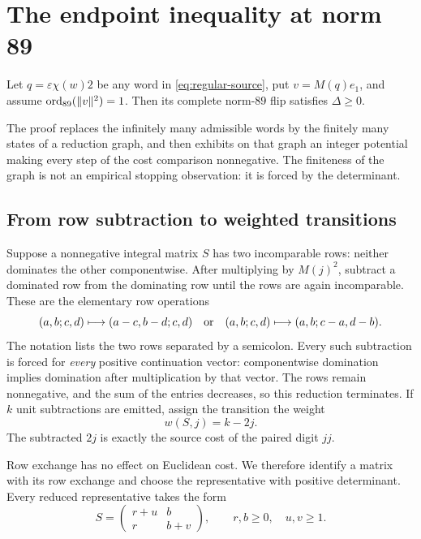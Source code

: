 \section{The endpoint inequality at norm 89}
\label{sec:endpoint}

\begin{theorem}
\label{thm:endpoint-89}
Let $q=\varepsilon\chi(w)2$ be any word in \eqref{eq:regular-source}, put
$v=M(q)e_1$, and assume $\operatorname{ord}_{89}(\|v\|^2)=1$. Then its complete norm-$89$
flip satisfies $\Delta\geqslant0$.
\end{theorem}

The proof replaces the infinitely many admissible words by the finitely
many states of a reduction graph, and then exhibits on that graph an
integer potential making every step of the cost comparison nonnegative.
The finiteness of the graph is not an empirical stopping observation: it
is forced by the determinant.

\subsection{From row subtraction to weighted transitions}

Suppose a nonnegative integral matrix $S$ has two incomparable rows:
neither dominates the other componentwise. After multiplying by $M(j)^2$,
subtract a dominated row from the dominating row until the rows are again
incomparable. These are the elementary row operations
$$
 (a,b;c,d)\longmapsto(a-c,b-d;c,d)
 \quad\hbox{or}\quad
 (a,b;c,d)\longmapsto(a,b;c-a,d-b).
$$
The notation lists the two rows separated by a semicolon. Every such
subtraction is forced for \emph{every} positive continuation vector:
componentwise domination implies domination after multiplication by that
vector. The rows remain nonnegative, and the sum of the entries decreases,
so this reduction terminates. If $k$ unit subtractions are emitted, assign
the transition the weight
\begin{equation}
 w(S,j)=k-2j.
 \label{eq:edge-weight}
\end{equation}
The subtracted $2j$ is exactly the source cost of the paired digit $jj$.

Row exchange has no effect on Euclidean cost. We therefore identify a
matrix with its row exchange and choose the representative with positive
determinant. Every reduced representative takes the form
\begin{equation}
 S=\begin{pmatrix}r+u&b\\r&b+v\end{pmatrix},\qquad
 r,b\geqslant0,\quad u,v\geqslant1.
 \label{eq:crossed-state}
\end{equation}


